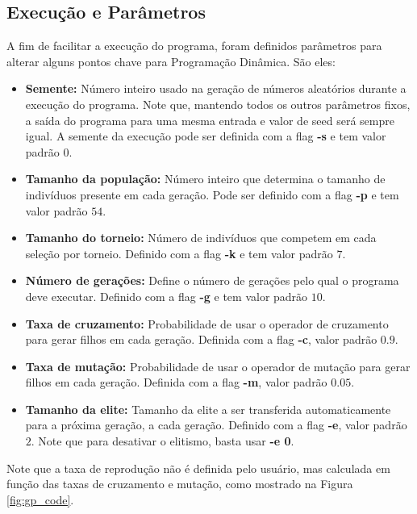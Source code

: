 \documentclass[12pt]{article}
\begin{document}
\subsection{Execução e Parâmetros}

A fim de facilitar a execução do programa, foram definidos parâmetros para alterar 
alguns pontos chave para Programação Dinâmica. São eles:

\begin{itemize}
 \item \textbf{Semente:} Número inteiro usado na geração de números aleatórios durante a 
 execução do programa. Note que, mantendo todos os outros parâmetros fixos, a saída
 do programa para uma mesma entrada e valor de seed será sempre igual. A semente
 da execução pode ser definida com a flag \textbf{-s} e tem valor padrão $ 0 $.
 
 \item \textbf{Tamanho da população:} Número inteiro que determina o tamanho de indivíduos
 presente em cada geração. Pode ser definido com a flag \textbf{-p} e tem valor padrão
 $ 54 $.
 
 \item \textbf{Tamanho do torneio:} Número de indivíduos que competem em cada seleção
 por torneio. Definido com a flag \textbf{-k} e tem valor padrão $ 7 $.
 
 \item \textbf{Número de gerações:} Define o número de gerações pelo qual o programa
 deve executar. Definido com a flag \textbf{-g} e tem valor padrão $ 10 $.
 
 \item \textbf{Taxa de cruzamento:} Probabilidade de usar o operador de cruzamento para
 gerar filhos em cada geração. Definida com a flag \textbf{-c}, valor padrão $ 0.9 $.
 
 \item \textbf{Taxa de mutação:} Probabilidade de usar o operador de mutação para
 gerar filhos em cada geração. Definida com a flag \textbf{-m}, valor padrão $ 0.05 $.
 
 \item \textbf{Tamanho da elite:} Tamanho da elite a ser transferida automaticamente para
 a próxima geração, a cada geração. Definido com a flag \textbf{-e}, valor padrão $ 2 $.
 Note que para desativar o elitismo, basta usar \textbf{-e 0}.
 
\end{itemize}

Note que a taxa de reprodução não é definida pelo usuário, mas calculada em função das 
taxas de cruzamento e mutação, como mostrado na Figura \ref{fig:gp_code}.
\end{document}
